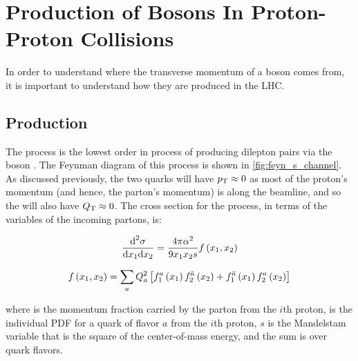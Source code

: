 

\section{Production of \texorpdfstring{\Z}{Z} Bosons In Proton-Proton Collisions}

In order to understand where the transverse momentum of a \Z boson comes from,
it is important to understand how they are produced in the LHC.

\subsection{\DrellYan Production}
\label{ssec:dy_production}

The \DrellYan process is the lowest order in \alphastrong process of producing
dilepton pairs via the \Z boson \cite{drell_1970}\cite{drell_1970a}. The
Feynman diagram of this process is shown in \cref{fig:feyn_s_channel}. As
discussed previously, the two quarks will have $p_{\mathrm{T}} \approx 0$ as most of the
proton's momentum (and hence, the parton's momentum) is along the beamline, and
so the \Z will also have $Q_{\mathrm{T}} \approx 0$. The cross section for the
\DrellYan process, in terms of the  variables of the incoming
partons, is:

\begin{equation}\label{eq:drell_yan_cross_section}
    \frac{\text{d}^{2}\sigma}
    {\text{d}x_{1} \text{d}x_{2}}
    =
    \frac{4 \pi \alpha^{2}}
    {9 x_{1} x_{2} s}
    f \left( x_{1}, x_{2} \right)
\end{equation}

\begin{equation}\label{eq:fx}
    f \left( x_{1}, x_{2} \right)
    =
    \sum_{a}
    Q^{2}_{a}
    \left[
        f^{a}_{1} \left( x_{1} \right)
        f^{\bar{a}}_{2} \left( x_{2} \right)
        +
        f^{\bar{a}}_{1} \left( x_{1} \right)
        f^{a}_{2} \left( x_{2} \right)
    \right]
\end{equation}

where  is the momentum fraction carried by the parton from the
$i$th proton,  is the individual PDF for a quark of
flavor $a$ from the $i$th proton, $s$ is the Mandelstam variable that is
the square of the center-of-mass energy, and the sum is over quark flavors.



